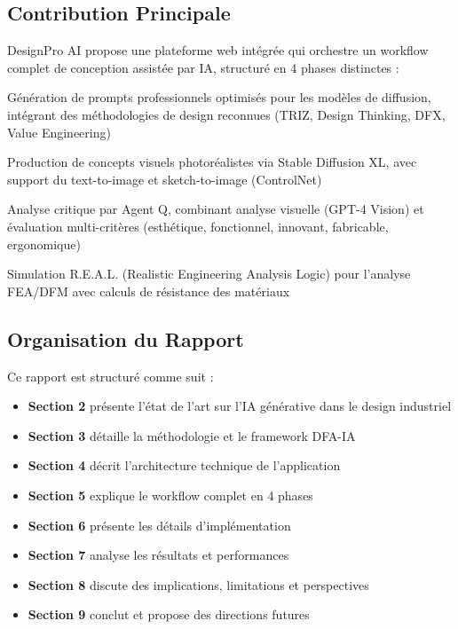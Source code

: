 \subsection{Contribution Principale}

DesignPro AI propose une plateforme web intégrée qui orchestre un workflow complet de conception assistée par IA, structuré en 4 phases distinctes :

\begin{description}[leftmargin=*]
    \item[Phase 1 - Idéation Intelligente :] Génération de prompts professionnels optimisés pour les modèles de diffusion, intégrant des méthodologies de design reconnues (TRIZ, Design Thinking, DFX, Value Engineering)
    
    \item[Phase 2 - Génération Visuelle :] Production de concepts visuels photoréalistes via Stable Diffusion XL, avec support du text-to-image et sketch-to-image (ControlNet)
    
    \item[Phase 3 - Évaluation Experte :] Analyse critique par Agent Q, combinant analyse visuelle (GPT-4 Vision) et évaluation multi-critères (esthétique, fonctionnel, innovant, fabricable, ergonomique)
    
    \item[Phase 4 - Validation Technique :] Simulation R.E.A.L. (Realistic Engineering Analysis Logic) pour l'analyse FEA/DFM avec calculs de résistance des matériaux
\end{description}

\subsection{Organisation du Rapport}

Ce rapport est structuré comme suit :

\begin{itemize}[leftmargin=*]
    \item \textbf{Section 2} présente l'état de l'art sur l'IA générative dans le design industriel
    \item \textbf{Section 3} détaille la méthodologie et le framework DFA-IA
    \item \textbf{Section 4} décrit l'architecture technique de l'application
    \item \textbf{Section 5} explique le workflow complet en 4 phases
    \item \textbf{Section 6} présente les détails d'implémentation
    \item \textbf{Section 7} analyse les résultats et performances
    \item \textbf{Section 8} discute des implications, limitations et perspectives
    \item \textbf{Section 9} conclut et propose des directions futures
\end{itemize}


